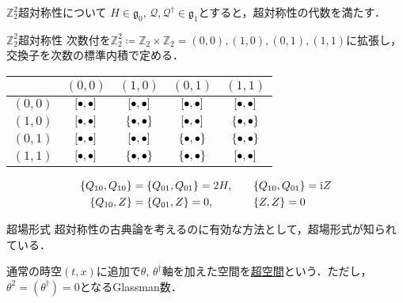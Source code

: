 \documentclass[dvipdfmx]{beamer}
\newcommand{\Z}{\mathbb{Z}}
\newcommand{\Ztt}{\mathbb{Z}_2^2}
\renewcommand{\i}{\mathrm{i}}
\newcommand{\Q}{\mathcal{Q}}
\newcommand{\g}{\mathfrak{g}}
\begin{document}
\begin{frame}
\begin{columns}[t]
\begin{column}{0.47\textwidth}
\begin{block}{$\Ztt$超対称性について}
					$H\in\g_0$, $\Q, \Q^\dag\in\g_1$とすると，超対称性の代数を満たす．
					\begin{itembox}{$\Ztt$超対称性}
						次数付を$\Ztt\coloneqq \Z_2 \times \Z_2 = {(0, 0), (1, 0), (0, 1), (1, 1)}$に拡張し，交換子を次数の標準内積で定める．
						\begin{table}[h]
							\centering
							\begin{tabular}{c|cccc}\hline
								 & $(0, 0)$ & $(1, 0)$ & $(0, 1)$ & $(1, 1)$\\\hline
								$(0, 0)$ & $\comm{\bullet}{\bullet}$ & $\comm{\bullet}{\bullet}$& $\comm{\bullet}{\bullet}$ & $\comm{\bullet}{\bullet}$\\
								$(1, 0)$ & $\comm{\bullet}{\bullet}$ & $\acomm{\bullet}{\bullet}$& $\comm{\bullet}{\bullet}$ & $\acomm{\bullet}{\bullet}$\\
								$(0, 1)$ & $\comm{\bullet}{\bullet}$ & $\comm{\bullet}{\bullet}$& $\acomm{\bullet}{\bullet}$ & $\acomm{\bullet}{\bullet}$\\
								$(1, 1)$ & $\comm{\bullet}{\bullet}$ & $\acomm{\bullet}{\bullet}$& $\acomm{\bullet}{\bullet}$ & $\comm{\bullet}{\bullet}$\\\hline
							\end{tabular}
						\end{table}
						\begin{alignat*}{3}
							\acomm{Q_{10}}{Q_{10}} &= \acomm{Q_{01}}{Q_{01}} = 2H, &\quad &\acomm{Q_{10}}{Q_{01}} = \i Z\\
							\acomm{Q_{10}}{Z} &= \acomm{Q_{01}}{Z} = 0, & & \acomm{Z}{Z} = 0
						\end{alignat*}
					\end{itembox}
				\end{block}

				\begin{block}{超場形式}
					超対称性の古典論を考えるのに有効な方法として，超場形式が知られている．

					通常の時空$(t, x)$に追加で$\theta$, $\theta^\dag$軸を加えた空間を\underline{超空間}という．ただし，$\theta^2 = (\theta^\dag) = 0$となるGlassman数．
					\begin{table}[h]
						\centering


\end{table}
\end{block}
\end{column}
\end{columns}
\end{frame}
\end{document}
